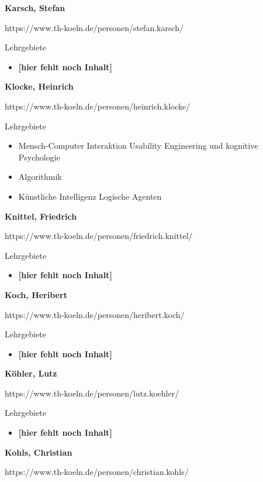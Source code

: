 \textbf{Karsch, Stefan}

https://www.th-koeln.de/personen/stefan.karsch/

Lehrgebiete

\begin{itemize}
\tightlist
\item
  \textbf{{[}hier fehlt noch Inhalt{]}}
\end{itemize}

\textbf{Klocke, Heinrich}

https://www.th-koeln.de/personen/heinrich.klocke/

Lehrgebiete

\begin{itemize}
\tightlist
\item
  Mensch-Computer Interaktion Usability Engineering und kognitive
  Psychologie
\item
  Algorithmik
\item
  Künstliche Intelligenz Logische Agenten
\end{itemize}

\textbf{Knittel, Friedrich}

https://www.th-koeln.de/personen/friedrich.knittel/

Lehrgebiete

\begin{itemize}
\tightlist
\item
  \textbf{{[}hier fehlt noch Inhalt{]}}
\end{itemize}

\textbf{Koch, Heribert}

https://www.th-koeln.de/personen/heribert.koch/

Lehrgebiete

\begin{itemize}
\tightlist
\item
  \textbf{{[}hier fehlt noch Inhalt{]}}
\end{itemize}

\textbf{Köhler, Lutz}

https://www.th-koeln.de/personen/lutz.koehler/

Lehrgebiete

\begin{itemize}
\tightlist
\item
  \textbf{{[}hier fehlt noch Inhalt{]}}
\end{itemize}

\textbf{Kohls, Christian}

https://www.th-koeln.de/personen/christian.kohls/

